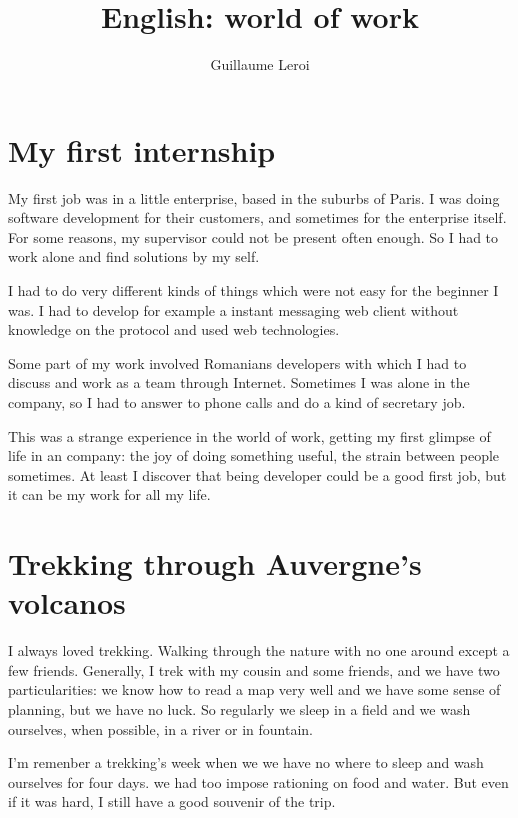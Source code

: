 \documentclass[a4paper, 12pt]{article}
\title{English: world of work}
\author{Guillaume Leroi}
\begin{document}
\maketitle

\section{My first internship}

My first job was in a little enterprise, based in the suburbs of
Paris. I was doing software development for their customers, and
sometimes for the enterprise itself. For some reasons, my supervisor
could not be present often enough. So I had to work alone and find
solutions by my self.

I had to do very different kinds of things which were not easy for the
beginner I was. I had to develop for example a instant messaging web
client without knowledge on the protocol and used web
technologies.

Some part of my work involved Romanians developers with which I had to
discuss and work as a team through Internet. Sometimes I was alone in
the company, so I had to answer to phone calls and do a kind of
secretary job.

This was a strange experience in the world of work, getting my first
glimpse of life in an company: the joy of doing something useful, the
strain between people sometimes. At least I discover that being
developer could be a good first job, but it can be my work for all my
life.

\section{Trekking through Auvergne's volcanos}

I always loved trekking. Walking through the nature with no one around
except a few friends. Generally, I trek with my cousin and some
friends, and we have two particularities: we know how to read a map
very well and we have some sense of planning, but we have no luck. So
regularly we sleep in a field and we wash ourselves, when possible, in
a river or in fountain.

I'm remenber a trekking's week when we we have no where to sleep and
wash ourselves for four days. we had too impose
rationing on food and water. But even if it was hard, I still have a
good souvenir of the trip.
\end{document}
